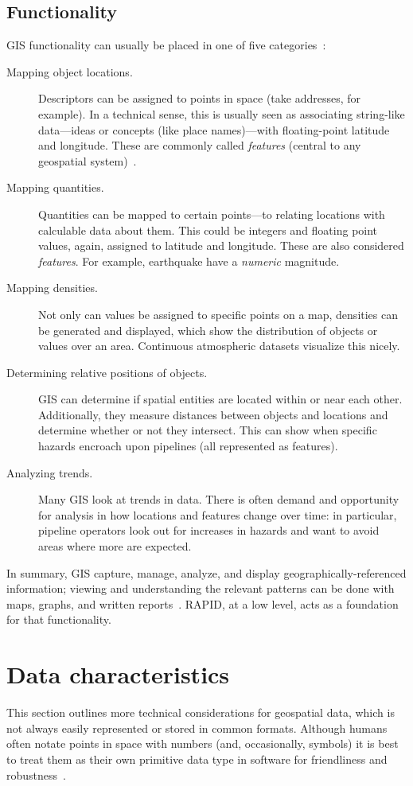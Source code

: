 \subsection{Functionality}
\label{gis_feature}
GIS functionality can usually be placed in one of five categories~\cite{Esriintro}:

\begin{description}
  \item[Mapping object locations.] Descriptors can be assigned to points in space (take addresses, for example). In a technical sense, this is usually seen as associating string-like data---ideas or concepts (like place names)---with floating-point latitude and longitude. These are commonly called \textit{features} (central to any geospatial system)~\cite{Kottman2009}.
  \item[Mapping quantities.] Quantities can be mapped to certain points---to relating locations with calculable data about them. This could be integers and floating point values, again, assigned to latitude and longitude. These are also considered \textit{features}. For example, earthquake have a \textit{numeric} magnitude.
  \item[Mapping densities.] Not only can values be assigned to specific points on a map, densities can be generated and displayed, which show the distribution of objects or values over an area. Continuous atmospheric datasets visualize this nicely.
  \item[Determining relative positions of objects.] GIS can determine if spatial entities are located within or near each other. Additionally, they measure distances between objects and locations and determine whether or not they intersect. This can show when specific hazards encroach upon pipelines (all represented as features).
  \item[Analyzing trends.] Many GIS look at trends in data. There is often demand and opportunity for analysis in how locations and features change over time: in particular, pipeline operators look out for increases in hazards and want to avoid areas where more are expected.
\end{description}

In summary, GIS capture, manage, analyze, and display geographically-referenced information; viewing and understanding the relevant patterns can be done with maps, graphs, and written reports~\cite{Esriintro}. RAPID, at a low level, acts as a foundation for that functionality.

\section{Data characteristics}
This section outlines more technical considerations for geospatial data, which is not always easily represented or stored in common formats. Although humans often notate points in space with numbers (and, occasionally, symbols) it is best to treat them as their own primitive data type in software for friendliness and robustness~\cite{gentle_intro}.

